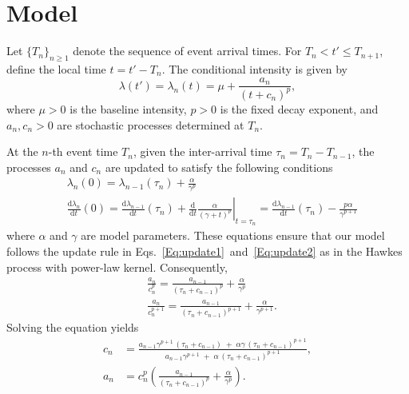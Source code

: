 \documentclass[11pt]{article}
\newcommand{\D}{\mathrm{d}}
\theoremstyle{definition}
\begin{document}
\section{Model}\label{Sect:model}	

Let \(\{T_n\}_{n \ge 1}\) denote the sequence of event arrival times.
For \(T_n < t' \le T_{n+1}\), define the local time \(t = t' - T_n\).
The conditional intensity is given by
\begin{equation}
	\lambda(t') = \lambda_{n}(t) = \mu + \frac{a_n}{(t  + c_n)^p},
	\label{eq:intensity}
\end{equation}
where \(\mu > 0\) is the baseline intensity, \(p > 0\) is the fixed decay exponent, and \(a_n, c_n > 0\) are stochastic processes determined at  $T_n$.

At the \(n\)-th event time \(T_n\), given the inter-arrival time \(\tau_n = T_n - T_{n-1}\), the processes \(a_n\) and \(c_n\) are updated to satisfy the following  conditions
\begin{align*}
	& \lambda_{n}(0) = \lambda_{n-1}(\tau_{n}) + \frac{\alpha}{\gamma^p} \\
	&\frac{\D \lambda_{n}}{\D t} (0) = \frac{\D \lambda_{n-1}}{\D t}(\tau_{n})  + \frac{\D}{\D t} \left. \frac{\alpha}{(\gamma + t)^p} \right|_{t = \tau_n} = \frac{\D \lambda_{n-1}}{\D t}(\tau_{n})   - \frac{p \alpha}{\gamma^{p+1}}
\end{align*}
where \(\alpha\) and \(\gamma\) are model parameters.
These equations ensure 
that our model follows the update rule in Eqs.~\eqref{Eq:update1}~and~\eqref{Eq:update2}
as in the Hawkes process with power-law kernel.
Consequently,
\begin{align}
	&\frac{a_n}{c_n^p} = \frac{a_{n-1}}{(\tau_n + c_{n-1})^p} + \frac{\alpha}{\gamma^p} \label{eq:update_level}\\
	&\frac{a_n}{c_n^{p+1}} = \frac{a_{n-1}}{(\tau_n + c_{n-1})^{p+1}} + \frac{\alpha}{\gamma^{p+1}}. \label{eq:update_slope}
\end{align}
Solving the equation yields
\begin{align*}
	c_n &= \frac{a_{n-1}\gamma^{p+1}\,(\tau_n+c_{n-1}) \;+\; \alpha\gamma\,(\tau_n+c_{n-1})^{p+1}}
	{a_{n-1}\gamma^{p+1} \;+\; \alpha\,(\tau_n+c_{n-1})^{p+1}}, \\
	a_n &= c_n^p  \left( \frac{a_{n-1}}{(\tau_n + c_{n-1})^p} + \frac{\alpha}{\gamma^p} \right).
\end{align*}
\end{document}
